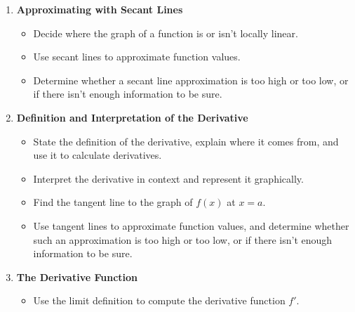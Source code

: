 \documentclass{article}
\begin{document}
\begin{enumerate}
\begin{itemize}
  \item Compute compositions of functions.

  \item Model situations systematically: identify your goal, define variables and express your goal in terms of those variables, and then look for relationships among your variables.

  \item Communicate your modeling process clearly. 
  \end{itemize}

  \addtocounter{enumi}{1}
  
\item \textbf{Approximating with Secant Lines} %
  \begin{itemize}
  \item Decide where the graph of a function is or isn't locally linear.

  \item Use secant lines to approximate function values.

  \item Determine whether a secant line approximation is too high or too low, or if there isn't enough information to be sure.

  \end{itemize}

\item \textbf{Definition and Interpretation of the Derivative} %
  \begin{itemize}
  \item State the definition of the derivative, explain where it comes from, and use it to calculate derivatives.

  \item Interpret the derivative in context and represent it graphically.

  \item Find the tangent line to the graph of $f(x)$ at $x = a$. 

  \item Use tangent lines to approximate function values, and determine whether such an approximation is too high or too low, or if there isn't enough information to be sure.
  \end{itemize}

\item \textbf{The Derivative Function} %
  \begin{itemize}
  \item Use the limit definition to compute the derivative function
    $f'$.


\end{itemize}
\end{enumerate}
\end{document}
